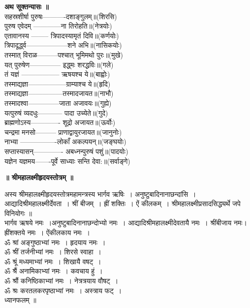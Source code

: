 \documentclass[twoside,top=1.7cm, bottom=1.7cm, outer=1cm,landscape, inner=1.5cm,a5paper,]{book}
\begin{document}
{\bfseries अथ सूक्तन्यासः ॥}\\
सहस्रशीर्षा पुरुषः----------दशाङ्गुलम्॥(शिरसि)\\
पुरुष एवेदम् ------------ना तिरोहति॥(नेत्रयोः)\\
एतावानस्य -------- त्रिपादस्यामृतं दिवि॥(कर्णयोः)\\
त्रिपादूर्द्ध्व------------------शने अभि॥(नासिकयोः)\\
तस्मात् विराळ---------पश्चात् भूमिमथो पुरः॥(मुखे)\\
यत् पुरुषेण-------------- इद्ध्मः शरद्धविः॥(गले)\\
तं यज्ञं ----------------- ऋषयश्च ये॥(बाह्वोः)\\
तस्माद्यज्ञा-----------------ग्राम्याश्च ये॥(हृदि)\\
तस्माद्यज्ञा---------------तस्मादजायत॥(नाभौ)\\
तस्मादश्वा--------------जाता अजावयः॥(गुह्ये)\\
यत्पुरुषं व्यदधुः----------- पादा उच्येते॥(गुदे)\\
ब्राह्मणोऽस्य------------- शूद्रो अजायत॥(ऊर्वोः)\\
चन्द्रमा मनसो--------- प्राणाद्वायुरजायत॥(जानुनोः)\\
नाभ्या ----------------लोकाँ अकल्पयन्॥(जङ्घयोः)\\
सप्तास्यासन्------------- अबध्नन्पुरुषं पशुं॥(पादयोः)\\
यज्ञेन यज्ञमय-------पूर्वे साध्याः सन्ति देवा:॥(सर्वाङ्गे)
\newpage
\begin{center}{\bfseries\Huge ॥ श्रीमहालक्ष्मीहृदयस्तोत्रम् ॥}\end{center}
अस्य श्रीमहालक्ष्मीहृदयस्तोत्रमहामन्त्रस्य भार्गव ऋषिः~। अनुष्टुबादिनानाछन्दांसि~। आद्यादिश्रीमहालक्ष्मीर्देवता~। श्रीं बीजम्~। ह्रीं शक्तिः~। ऐं कीलकम्~। श्रीमहालक्ष्मीप्रसादसिद्ध्यर्थे जपे विनियोगः ॥\\
भार्गव ऋषये नमः~।अनुष्टुबादिनानाछन्दोभ्यो नमः~। आद्यादिश्रीमहालक्ष्मीदेवतायै नमः~। श्रींबीजाय नमः। ह्रींशक्तये नमः~। ऐंकीलकाय नमः~।\\
ॐ श्रां अङ्गुष्ठाभ्यां नमः~। हृदयाय नमः~।\\
ॐ श्रीं तर्जनीभ्यां नमः~। शिरसे स्वाहा~।\\
ॐ श्रूं मध्यमाभ्यां नमः~। शिखायै वषट्~।\\
ॐ श्रैं अनामिकाभ्यां नमः~। कवचाय हुं~।\\
ॐ श्रौं कनिष्ठिकाभ्यां नमः~। नेत्रत्रयाय वौषट्~।\\
ॐ श्रः करतलकरपृष्ठाभ्यां नमः~। अस्त्राय फट्~।\\
ध्यानफलम् ॥
\end{document}
